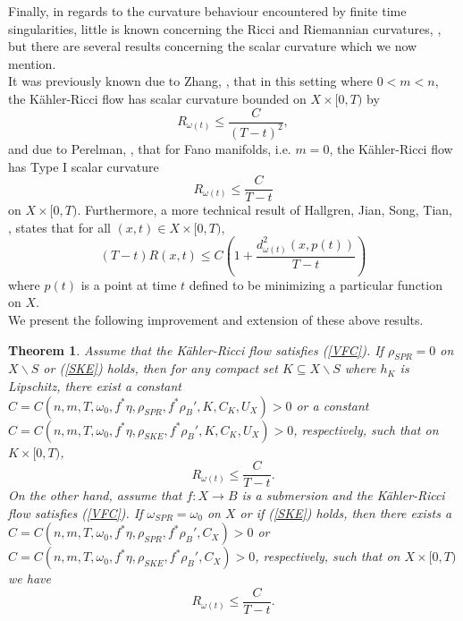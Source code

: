 \documentclass[12pt]{article}
\newtheorem{theorem}{Theorem}[section]
\numberwithin{equation}{section}
\begin{document}
\noindent Finally, in regards to the curvature behaviour encountered by finite time singularities, little is known concerning the Ricci and Riemannian curvatures, \cite{B25I,CHM25,MT25}, but there are several results concerning the scalar curvature which we now mention.\\
It was previously known due to Zhang, \cite{Z10}, that in this setting where $0 < m < n$, the K\"ahler-Ricci flow has scalar curvature bounded on $X \times [0,T)$ by
\begin{equation*}
    R_{\omega(t)} \leq \frac{C}{(T-t)^2},
\end{equation*}
and due to Perelman, \cite{ST08}, that for Fano manifolds, i.e. $m = 0$, the K\"ahler-Ricci flow has Type I scalar curvature
\begin{equation*}
    R_{\omega(t)} \leq \frac{C}{T-t}
\end{equation*}
on $X \times [0,T)$. Furthermore, a more technical result of Hallgren, Jian, Song, Tian, \cite{JST23,HJST23}, states that for all $(x,t) \in X \times [0,T)$,
\begin{equation*}
    (T-t)R(x,t) \leq C\left(1 + \frac{d^2_{\omega(t)}(x,p(t))}{T-t}\right)
\end{equation*}
where $p(t)$ is a point at time $t$ defined to be minimizing a particular function on $X$.\\

\noindent We present the following improvement and extension of these above results.

\begin{theorem}
Assume that the K\"ahler-Ricci flow satisfies (\ref{VFC}). If $\rho_{SPR} = 0$ on $X \backslash S$ or (\ref{SKE}) holds, then for any compact set $K \subseteq X \backslash S$ where $h_K$ is Lipschitz, there exist a constant $C = C(n,m,T,\omega_0,f^*\eta,\rho_{SPR},f^*\rho_B',K,C_K,U_X) > 0$ or a constant $C = C(n,m,T,\omega_0,f^*\eta,\rho_{SKE},f^*\rho_B',K,C_K,U_X) > 0$, respectively, such that on $K \times [0,T)$,
\begin{equation*}
    R_{\omega(t)} \leq \frac{C}{T-t}.
\end{equation*}
On the other hand, assume that $f:X \to B$ is a submersion and the K\"ahler-Ricci flow satisfies (\ref{VFC}). If $\omega_{SPR} = \omega_{0}$ on $X$ or if (\ref{SKE}) holds, then there exists a $C = C(n,m,T,\omega_0, f^*\eta,\rho_{SPR},f^*\rho_B',C_X) > 0$ or $C = C(n,m,T,\omega_0,f^*\eta,\rho_{SKE},f^*\rho_B',C_X) > 0$, respectively, such that on $X \times [0,T)$ we have
\begin{equation*}
    R_{\omega(t)} \leq \frac{C}{T-t}.
\end{equation*}
\end{theorem}
\end{document}
